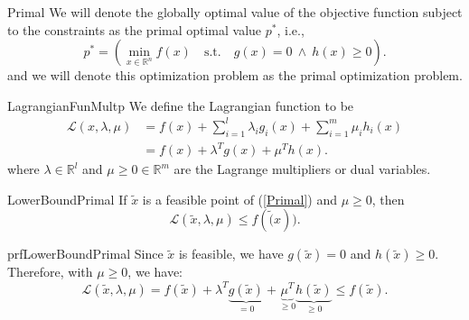 \begin{theo}{Primal}
    We will denote the globally optimal value of the objective function subject to the constraints as the primal optimal value $p^*$, i\@.e\@., 
    \begin{equation*}
        p^* = \left( \min_{x \in \mathbb{R}^n} f(x) \quad \text{s.t.} \quad g(x) = 0 \ \land \ h(x) \geq 0 \right).
    \end{equation*}
    and we will denote this optimization problem as the primal optimization problem.
\end{theo}

\newpage

\begin{theo}{LagrangianFunMultp}
    We define the Lagrangian function to be 
    \begin{align*}
        \mathcal{L}(x, \lambda, \mu) 
            &= f(x) + \sum_{i=1}^l \lambda_i g_i(x) + \sum_{i=1}^m \mu_i h_i(x) \\
            &= f(x) + \lambda^T g(x) + \mu^T h(x).
    \end{align*}
    where $\lambda \in \mathbb{R}^l$ and $\mu \geq 0 \in \mathbb{R}^m$ are the Lagrange multipliers or dual variables.
\end{theo}

\begin{lem}{LowerBoundPrimal}
    If $\tilde{x}$ is a feasible point of (\ref{Primal}) and $\mu \geq 0$, then
    \begin{equation*}
        \mathcal{L}(\tilde{x}, \lambda, \mu) \leq f(\tilde(x)).
    \end{equation*}
    \vspace*{-0.5cm}
\end{lem}

\begin{prf}{prfLowerBoundPrimal}
    Since $\tilde{x}$ is feasible, we have $g(\tilde{x}) = 0$ and $h(\tilde{x}) \geq 0$. Therefore, with $\mu \geq 0$, we have:
    \begin{equation*}
        \mathcal{L}(\tilde{x}, \lambda, \mu) = f(\tilde{x}) + \lambda^T \underbrace{g(\tilde{x})}_{=0} + \underbrace{\mu^T}_{\geq 0} \underbrace{h(\tilde{x})}_{\geq 0} \leq f(\tilde{x}).
    \end{equation*}
    \vspace*{-0.5cm}
\end{prf}

